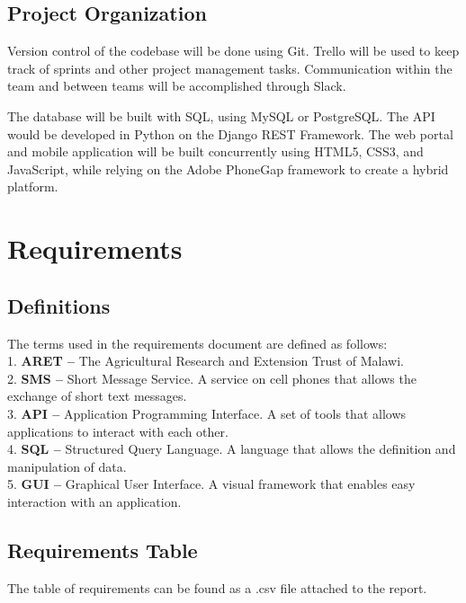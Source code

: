 \documentclass[12pt,letterpaper]{article}
\begin{document}
\subsection{Project Organization}
Version control of the codebase will be done using Git. Trello will be used to keep track of sprints and other project management tasks. Communication within the team and between teams will be accomplished through Slack.\par
The database will be built with SQL, using MySQL or PostgreSQL. The API would be developed in Python on the Django REST Framework. The web portal and mobile application will be built concurrently using HTML5, CSS3, and JavaScript, while relying on the Adobe PhoneGap framework to create a hybrid platform.

\clearpage
\section{Requirements}
\subsection{Definitions}
The terms used in the requirements document are defined as follows:\\
1. \hspace*{5pt} \textbf{ARET -- } The Agricultural Research and Extension Trust of Malawi. \\
2. \hspace*{5pt} \textbf{SMS -- } Short Message Service. A service on cell phones that allows the exchange of short text messages.\\
3. \hspace*{5pt} \textbf{API -- } Application Programming Interface. A set of tools that allows applications to interact with each other.\\
4. \hspace*{5pt} \textbf{SQL -- } Structured Query Language. A language that allows the definition and manipulation of data.\\
5. \hspace*{5pt} \textbf{GUI -- } Graphical User Interface. A visual framework that enables easy interaction with an application.

\subsection{Requirements Table}
The table of requirements can be found as a .csv file attached to the report.
\end{document}
